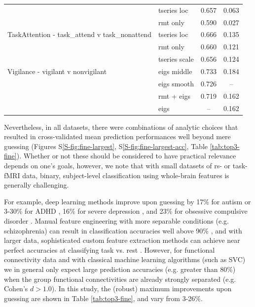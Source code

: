\documentclass[12pt]{spieman}  %
\begin{document}
\begin{spacing}{2}
\begin{table}[h!]
\begin{tabular}{llcc}
                                   & tseries loc   &  0.657 &  0.063 \\
                                   & rmt only      &  0.590 &  0.027 \\
TaskAttention - task\_attend v task\_nonattend     & tseries loc &  0.666 &
0.135 \\
                                   & rmt only      &  0.660 &  0.121 \\
                                   & tseries scale &  0.656 &  0.124 \\
Vigilance - vigilant v nonvigilant & eigs middle   &  0.733 &  0.184 \\
                                   & eigs smooth   &  0.726 &    –   \\
                                   & rmt + eigs    &  0.719 &  0.162 \\
                                   & eigs          &    –   &  0.162 \\
\hline
\end{tabular}
\end{table}


Nevertheless, in all datasets, there were combinations of analytic choices that
resulted in cross-validated mean prediction performances well beyond mere
guessing (Figures S\ref{S-fig:fine-largest}, S\ref{S-fig:fine-largest-acc},
Table \ref{tab:top3-fine}). Whether or not these should be considered to have
practical relevance depends on one's goals, however, we note that with small
datasets of rs- or task-fMRI data, binary, subject-level classification using
whole-brain features is generally challenging.

For example, deep learning methods improve upon guessing by 17\% for autism
\cite{bengs4DSpatioTemporalDeep2020} or 3-30\% for ADHD
\cite{riazDeepFMRIEndtoendDeep2020}, 16\% for severe depression
\cite{ramasubbuAccuracyAutomatedClassification2016}, and 23\% for obsessive
compulsive disorder \cite{takagiNeuralMarkerObsessiveCompulsive2017}. Manual
feature engineering with more separable conditions (e.g. schizophrenia) can
result in classification accuracies well above 90\%
\cite{duHighClassificationAccuracy2012}, and with larger data, sophisticated
custom feature extraction methods can achieve near perfect accuracies at
classifying task vs. rest
\cite{zhangCharacterizingDifferentiatingTaskbased2016}. However, for functional
connectivity data and with classical machine learning algorithms (such as SVC)
we in general only expect large prediction accuracies (e.g. greater than 80\%)
when the group functional connectivities are already strongly separated (e.g.
Cohen’s \(d > 1.0\))\cite{dansereauStatisticalPowerPrediction2017}. In this
study, the (robust) maximum improvements upon guessing are shown in Table
\ref{tab:top3-fine}, and vary from 3-26\%.


\end{spacing}
\end{document}
